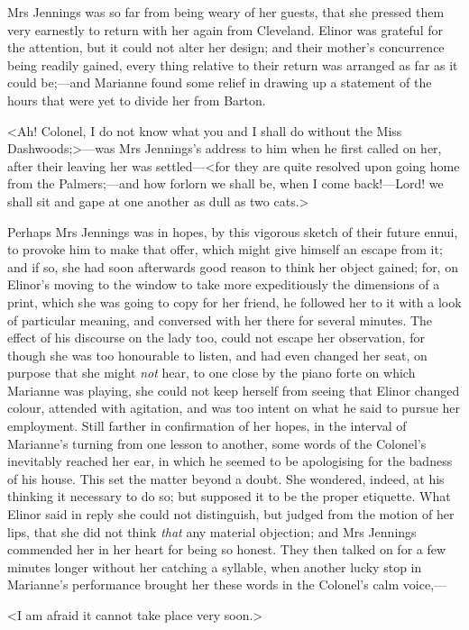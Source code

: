 Mrs Jennings was so far from being weary of her guests, that she pressed them very earnestly to return with her again from Cleveland. Elinor was grateful for the attention, but it could not alter her design; and their mother's concurrence being readily gained, every thing relative to their return was arranged as far as it could be;—and Marianne found some relief in drawing up a statement of the hours that were yet to divide her from Barton.

<Ah! Colonel, I do not know what you and I shall do without the Miss Dashwoods;>—was Mrs Jennings's address to him when he first called on her, after their leaving her was settled—<for they are quite resolved upon going home from the Palmers;—and how forlorn we shall be, when I come back!—Lord! we shall sit and gape at one another as dull as two cats.>

Perhaps Mrs Jennings was in hopes, by this vigorous sketch of their future ennui, to provoke him to make that offer, which might give himself an escape from it; and if so, she had soon afterwards good reason to think her object gained; for, on Elinor's moving to the window to take more expeditiously the dimensions of a print, which she was going to copy for her friend, he followed her to it with a look of particular meaning, and conversed with her there for several minutes. The effect of his discourse on the lady too, could not escape her observation, for though she was too honourable to listen, and had even changed her seat, on purpose that she might \textit{not} hear, to one close by the piano forte on which Marianne was playing, she could not keep herself from seeing that Elinor changed colour, attended with agitation, and was too intent on what he said to pursue her employment. Still farther in confirmation of her hopes, in the interval of Marianne's turning from one lesson to another, some words of the Colonel's inevitably reached her ear, in which he seemed to be apologising for the badness of his house. This set the matter beyond a doubt. She wondered, indeed, at his thinking it necessary to do so; but supposed it to be the proper etiquette. What Elinor said in reply she could not distinguish, but judged from the motion of her lips, that she did not think \textit{that} any material objection; and Mrs Jennings commended her in her heart for being so honest. They then talked on for a few minutes longer without her catching a syllable, when another lucky stop in Marianne's performance brought her these words in the Colonel's calm voice,—

<I am afraid it cannot take place very soon.>

